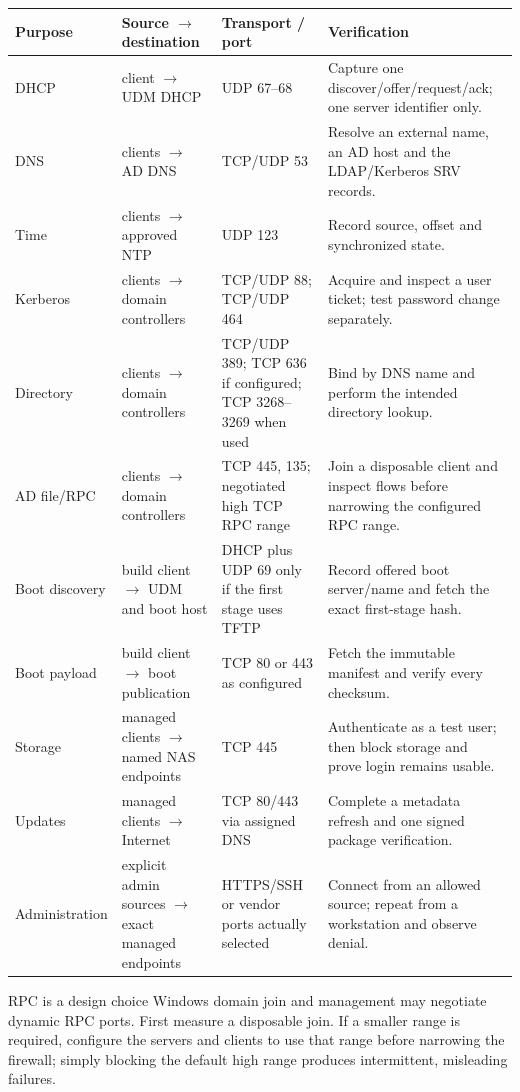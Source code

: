 \begingroup
\small
\begin{tabularx}{\linewidth}{@{}p{.16\linewidth}p{.20\linewidth}p{.19\linewidth}L@{}}
\toprule
\textbf{Purpose} & \textbf{Source $\rightarrow$ destination} &
\textbf{Transport / port} & \textbf{Verification}\\
\midrule
DHCP & client $\rightarrow$ UDM DHCP & UDP 67--68 &
Capture one discover/offer/request/ack; one server identifier only.\\
DNS & clients $\rightarrow$ AD DNS & TCP/UDP 53 &
Resolve an external name, an AD host and the LDAP/Kerberos SRV records.\\
Time & clients $\rightarrow$ approved NTP & UDP 123 &
Record source, offset and synchronized state.\\
Kerberos & clients $\rightarrow$ domain controllers & TCP/UDP 88; TCP/UDP 464 &
Acquire and inspect a user ticket; test password change separately.\\
Directory & clients $\rightarrow$ domain controllers & TCP/UDP 389; TCP 636 if configured; TCP 3268--3269 when used &
Bind by DNS name and perform the intended directory lookup.\\
AD file/RPC & clients $\rightarrow$ domain controllers & TCP 445, 135; negotiated high TCP RPC range &
Join a disposable client and inspect flows before narrowing the configured RPC range.\\
Boot discovery & build client $\rightarrow$ UDM and boot host & DHCP plus UDP 69 only if the first stage uses TFTP &
Record offered boot server/name and fetch the exact first-stage hash.\\
Boot payload & build client $\rightarrow$ boot publication & TCP 80 or 443 as configured &
Fetch the immutable manifest and verify every checksum.\\
Storage & managed clients $\rightarrow$ named NAS endpoints & TCP 445 &
Authenticate as a test user; then block storage and prove login remains usable.\\
Updates & managed clients $\rightarrow$ Internet & TCP 80/443 via assigned DNS &
Complete a metadata refresh and one signed package verification.\\
Administration & explicit admin sources $\rightarrow$ exact managed endpoints & HTTPS/SSH or vendor ports actually selected &
Connect from an allowed source; repeat from a workstation and observe denial.\\
\bottomrule
\end{tabularx}
\endgroup

\begin{telospanel}{RPC is a design choice}
Windows domain join and management may negotiate dynamic RPC ports.  First
measure a disposable join.  If a smaller range is required, configure the
servers and clients to use that range before narrowing the firewall; simply
blocking the default high range produces intermittent, misleading failures.
\end{telospanel}

